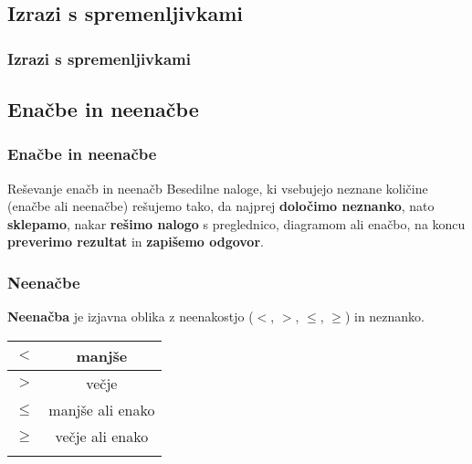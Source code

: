     \subsection{Izrazi s spremenljivkami}
        
        \begin{frame}[t]
            \frametitle{Izrazi s spremenljivkami}
        \end{frame}

    \subsection{Enačbe in neenačbe}
        
        \begin{frame}[t]
            \frametitle{Enačbe in neenačbe}

            \begin{alertblock}{Reševanje enačb in neenačb}
                Besedilne naloge, ki vsebujejo neznane količine (enačbe ali neenačbe) rešujemo tako, da najprej \textbf{določimo neznanko}, nato \textbf{sklepamo}, nakar \textbf{rešimo nalogo} s preglednico, diagramom ali enačbo, na koncu \textbf{preverimo rezultat} in \textbf{zapišemo odgovor}.
            \end{alertblock}
        \end{frame}

        \begin{frame}[t]
            \frametitle{Neenačbe}

            \begin{alertblock}{}
                \textbf{Neenačba} je izjavna oblika z neenakostjo ($<$, $>$, $\leq$, $\geq$) in neznanko.
            \end{alertblock}

            \begin{table}
                \centering
                \addtolength{\tabcolsep}{6pt}
                \renewcommand{\arraystretch}{1.5}                
                \begin{tabular}{||c|c||} 
                    \hhline{|t:==:t|}
                            $\mathbf{<}$ & manjše   \\ 
                    \hline
                            $\mathbf{>}$ & večje   \\ 
                    \hline
                            $\mathbf{\leq}$ & manjše ali enako   \\ 
                    \hline
                            $\mathbf{\geq}$ & večje ali enako  \\  
                    \hhline{|b:==:b|}
                \end{tabular}
            \end{table}

        \end{frame}

